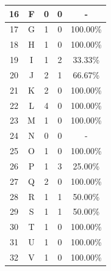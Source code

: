 \begin{longtable}[c]{|c|c|c|c|c|}
	16           & F                 & 0                       & 0                       & -            \\ \hline
	17           & G                 & 1                       & 0                       &100.00\%            \\ \hline
	18           & H                 & 1                       & 0                       &100.00\%            \\ \hline
	19           & I                 & 1                       & 2                       &33.33\%            \\ \hline
	20           & J                 & 2                       & 1                       &66.67\%            \\ \hline
	21           & K                 & 2                       & 0                       &100.00\%            \\ \hline
	22           & L                 & 4                       & 0                       &100.00\%            \\ \hline
	23           & M                 & 1                       & 0                       &100.00\%            \\ \hline
	24           & N                 & 0                       & 0                       & -            \\ \hline
	25           & O                 & 1                       & 0                       &100.00\%            \\ \hline
	26           & P                 & 1                       & 3                       &25.00\%            \\ \hline
	27           & Q                 & 2                       & 0                       &100.00\%            \\ \hline
	28           & R                 & 1                       & 1                       &50.00\%            \\ \hline
	29           & S                 & 1                       & 1                       &50.00\%            \\ \hline
	30           & T                 & 1                       & 0                       &100.00\%            \\ \hline
	31           & U                 & 1                       & 0                       &100.00\%            \\ \hline
	32           & V                 & 1                       & 0                       &100.00\%            \\ \hline

\end{longtable}
